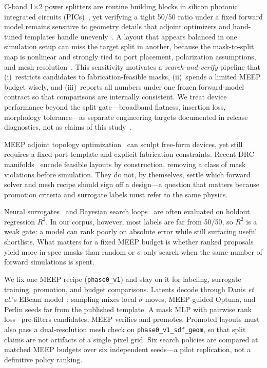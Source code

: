 \documentclass[11pt,a4paper]{article}
\begin{document}
C-band 1$\times$2 power splitters are routine building blocks in silicon photonic integrated circuits (PICs)~\cite{LalauKranz2013Splitters,Joannopoulos2011Waveguides}, yet verifying a tight 50/50 ratio under a fixed forward model remains sensitive to geometry details that adjoint optimizers and hand-tuned templates handle unevenly~\cite{Piggott2017InverseDesign,Hammond2022MeepAdjoint}.
A layout that appears balanced in one simulation setup can miss the target split in another, because the mask-to-split map is nonlinear and strongly tied to port placement, polarization assumptions, and mesh resolution~\cite{Piggott2017InverseDesign}.
This sensitivity motivates a \emph{search-and-verify} pipeline that (i)~restricts candidates to fabrication-feasible masks, (ii)~spends a limited MEEP budget wisely, and (iii)~reports all numbers under one frozen forward-model contract so that comparisons are internally consistent.
We treat device performance beyond the split gate---broadband flatness, insertion loss, morphology tolerance---as separate engineering targets documented in release diagnostics, not as claims of this study~\cite{Hansen2024BroadbandSplitters,Piggott2017FabricationConstrained}.

MEEP adjoint topology optimization~\cite{Oskooi2010Meep,Hammond2022MeepAdjoint} can sculpt free-form devices, yet still requires a fixed port template and explicit fabrication constraints.
Recent DRC manifolds~\cite{Danis2026DRCManifold} encode feasible layouts by construction, removing a class of mask violations before simulation.
They do not, by themselves, settle which forward solver and mesh recipe should sign off a design---a question that matters because promotion criteria and surrogate labels must refer to the same physics.

Neural surrogates~\cite{Jiang2021SurrogateReview,Su2021DeepSurrogate} and Bayesian search loops~\cite{Shahriari2016BO,Freitas2020BO,SciRep2025CNNIBO,MAPS2025} are often evaluated on holdout regression $R^2$.
In our corpus, however, most labels are far from 50/50, so $R^2$ is a weak gate: a model can rank poorly on absolute error while still surfacing useful shortlists.
What matters for a fixed MEEP budget is whether ranked proposals yield more in-spec masks than random or $\sigma$-only search when the same number of forward simulations is spent.

We fix one MEEP recipe (\texttt{phase0\_v1}) and stay on it for labeling, surrogate training, promotion, and budget comparisons.
Latents decode through Danis \emph{et al.}'s EBeam model~\cite{Danis2026DRCManifold}; sampling mixes local $\sigma$ moves, MEEP-guided Optuna, and Perlin seeds far from the published template.
A mask MLP with pairwise rank loss~\cite{Burges2010LambdaRank} pre-filters candidates; MEEP verifies and promotes.
Promoted layouts must also pass a dual-resolution mesh check on \texttt{phase0\_v1\_sdf\_geom}, so that split claims are not artifacts of a single pixel grid.
Six search policies are compared at matched MEEP budgets over six independent seeds---a pilot replication, not a definitive policy ranking.
\end{document}
